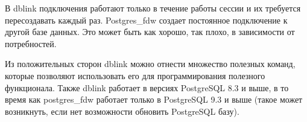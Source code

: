 В dblink подключения работают только в течение работы сессии и их требуется пересоздавать каждый раз. Postgres\_fdw создает постоянное подключение к другой базе данных. Это может быть как хорошо, так плохо, в зависимости от потребностей.

Из положительных сторон dblink можно отнести множество полезных команд, которые позволяют использовать его для программирования полезного функционала. Также dblink работает в версиях PostgreSQL 8.3 и выше, в то время как postgres\_fdw работает только в PostgreSQL 9.3 и выше (такое может возникнуть, если нет возможности обновить PostgreSQL базу).
